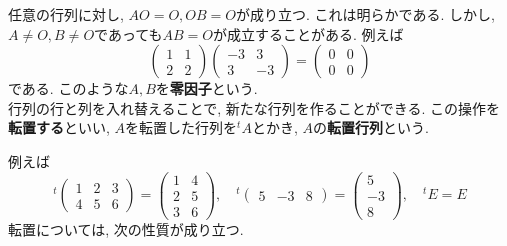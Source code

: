         任意の行列に対し, $AO=O,OB=O$が成り立つ. これは明らかである. しかし, $A\neq O,B\neq O$であっても$AB=O$が成立することがある.
        例えば
        \begin{equation*}
            \begin{pmatrix}
                1 & 1 \\ 2 & 2
            \end{pmatrix}
            \begin{pmatrix}
                -3 & 3 \\ 3 & -3
            \end{pmatrix}
            =\begin{pmatrix}
                0 & 0 \\ 0 & 0
            \end{pmatrix}
        \end{equation*}
        である. このような$A,B$を\textbf{零因子}という.\\

        行列の行と列を入れ替えることで, 新たな行列を作ることができる. この操作を\textbf{転置する}といい,
        $A$を転置した行列を$^t\!A$とかき, $A$の\textbf{転置行列}という.

        例えば
        \begin{equation*}
            ^t\!\begin{pmatrix}
                1 & 2 & 3\\
                4 & 5 & 6
            \end{pmatrix}
            =\begin{pmatrix}
                1 & 4\\
                2 & 5\\
                3 & 6
            \end{pmatrix}
            ,\quad
            ^t\!\begin{pmatrix}
                5 & -3 & 8
            \end{pmatrix}
            =\begin{pmatrix}
                5 \\ -3 \\ 8
            \end{pmatrix}
            ,\quad
            ^t\!E = E
        \end{equation*}
        転置については, 次の性質が成り立つ.

